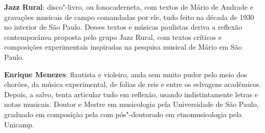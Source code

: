 \textbf{Jazz Rural}: disco"-livro, ou fonocaderneta, com textos de Mário de Andrade e gravações musicais de campo comandadas por ele, tudo feito na década de 1930 no interior de São Paulo. Desses textos e músicas paulistas deriva a reflexão contemporânea proposta pelo grupo Jazz Rural, com textos críticos e composições experimentais inspiradas na pesquisa musical de Mário em São Paulo.
        
\textbf{Enrique Menezes}: flautista e violeiro, anda sem muito pudor pelo meio dos chorões, da música experimental, de folias de reis e entre os selvagens acadêmicos. Depois, a salvo, tenta articular tudo em reflexão, usando indistintamente letras e notas musicais. Doutor e Mestre em musicologia pela Universidade de São Paulo, graduado em composição pela  com pós"-doutorado em etnomusicologia pela Unicamp.

